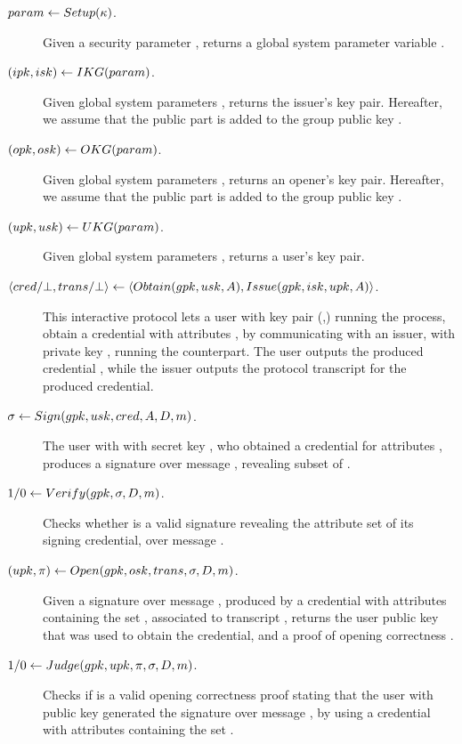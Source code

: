 \begin{description}
\item[$param \gets Setup(\kappa)$.] Given a security parameter \secpar,
  returns a global system parameter variable \parm.
\item[$(ipk,isk) \gets IKG(param)$.] Given global system parameters
  \parm, returns the issuer's key pair. Hereafter, we assume that the public
  part \ipk is added to the group public key \gpk.
\item[$(opk,osk) \gets OKG(param)$.] Given global system parameters
  \parm, returns an opener's key pair. Hereafter, we assume that the public part
  \opk is added to the group public key \gpk.
\item[$(upk,usk) \gets UKG(param)$.] Given global system parameters
  \parm, returns a user's key pair.
\item[$\langle cred/\bot,trans/\bot \rangle \gets
  \langle Obtain(gpk,usk,A),Issue(gpk,isk,upk,A) \rangle$.]
  This interactive protocol lets a user with key pair (\upk,\usk) running the
  \Obtain process, obtain a credential \cred with attributes \Attrs, by
  communicating with an issuer, with private key \isk, running the \Issue
  counterpart. The user outputs the produced credential \cred, while the issuer
  outputs the protocol transcript \utrans for the produced credential.
\item[$\sigma \gets Sign(gpk,usk,cred,A,D,m)$.] The user with
  with secret key \usk, who obtained a credential \cred for attributes \Attrs,
  produces a signature over message \msg, revealing subset \DAttrs of \Attrs.
\item[$1/0 \gets Verify(gpk,\sigma,D,m)$.] Checks whether \sig is a
  valid signature revealing the attribute set \DAttrs of its signing credential,
  over message \msg.
\item[$(upk,\pi) \gets Open(gpk,osk,trans,\sigma,D,m)$.]
  Given a signature \sig over message \msg, produced by a credential with
  attributes containing the set \DAttrs, associated to transcript \utrans,
  returns the user public key that was used to obtain the credential, and a
  proof of opening correctness \oproof.  
\item[$1/0 \gets Judge(gpk,upk,\pi,\sigma,D,m)$.] Checks if
  \oproof is a valid opening correctness proof stating that the user with public
  key \upk generated the signature \sig over message \msg, by using a credential
  with attributes containing the set \DAttrs. 
\end{description}

